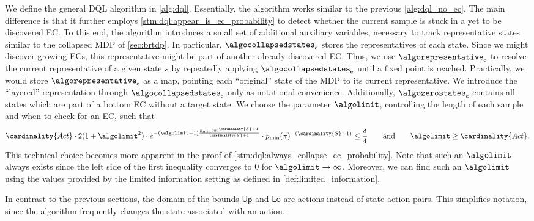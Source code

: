 \documentclass{article}
\newcommand{\States}{S}
\newcommand{\Actions}{Act}
\newcommand{\strategy}{\pi}
\newcommand{\upperbound}{\mathsf{Up}}
\newcommand{\lowerbound}{\mathsf{Lo}}
\newcommand{\algoepisode}{\mathsf{e}}
\begin{document}
    
We define the general DQL algorithm in \cref{alg:dql}.
Essentially, the algorithm works similar to the previous \cref{alg:dql_no_ec}.
The main difference is that it further employs \cref{stm:dql:appear_is_ec_probability} to detect whether the current sample is stuck in a yet to be discovered EC.
To this end, the algorithm introduces a small set of additional auxiliary variables, necessary to track representative states similar to the collapsed MDP of \cref{sec:brtdp}.
In particular, $\algocollapsedstates_\algoepisode$ stores the representatives of each state.
Since we might discover growing ECs, this representative might be part of another already discovered EC.
Thus, we use $\algorepresentative_\algoepisode$ to resolve the current representative of a given state $s$ by repeatedly applying $\algocollapsedstates_\algoepisode$ until a fixed point is reached.
Practically, we would store $\algorepresentative_\algoepisode$ as a map, pointing each \enquote{original} state of the MDP to its current representative.
We introduce the \enquote{layered} representation through $\algocollapsedstates_\algoepisode$ only as notational convenience.
Additionally, $\algozerostates_\algoepisode$ contains all states which are part of a bottom EC without a target state.
We choose the parameter $\algolimit$, controlling the length of each sample and when to check for an EC, such that
\begin{equation}
	\cardinality{\Actions} \cdot 2 (1 + \algolimit^2) \cdot e^{- (\algolimit - 1) \frac{p_{\min}(\strategy)^{\cardinality{\States} + 1}}{\cardinality{\States} + 1}} \cdot p_{\min}(\strategy)^{-(\cardinality{\States}+1)} \leq \frac{\delta}{4} \qquad \text{and} \qquad \algolimit \geq \cardinality{\Actions}. \label{eq:dql:choice_of_limit}
\end{equation}
This technical choice becomes more apparent in the proof of \cref{stm:dql:always_collapse_ec_probability}.
Note that such an $\algolimit$ always exists since the left side of the first inequality converges to $0$ for $\algolimit \to \infty$.
Moreover, we can find such an $\algolimit$ using the values provided by the limited information setting as defined in \cref{def:limited_information}.

\begin{remark}
	In contrast to the previous sections, the domain of the bounds $\upperbound$ and $\lowerbound$ are actions instead of state-action pairs.
	This simplifies notation, since the algorithm frequently changes the state associated with an action.
\end{remark}
\end{document}
